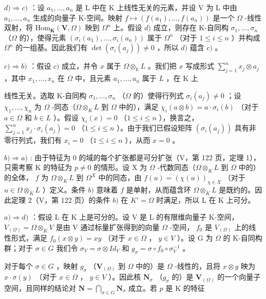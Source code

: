 \(d) \Rightarrow c)\) ：设 \(a_1, \ldots, a_n\) 是 L 中在 K 上线性无关的元素，并设 V 为 L 中由 \(a_1, \ldots, a_n\) 生成的向量子 K-空间。映射 \(f \mapsto (f(a_1), \ldots, f(a_n))\) 是一个 \(\Omega\) -线性双射，将 \(\mathrm{Hom}_{\mathbf{K}}(\mathbf{V}, \Omega)\) 映到 \(\Omega^n\) 上。假设 \(d)\) 成立，则存在 K-自同构 \(\sigma_1, \ldots, \sigma_n\) （\(\Omega\) 的），使得元素 \((\sigma_i(a_1), \ldots, \sigma_i(a_n))\) 属于 \(\Omega^n\) （对于 \(1 \leqslant i \leqslant n\) ）并构成 \(\Omega^n\) 的一组基。因此我们有 \(\det(\sigma_i(a_j)) \neq 0\) ，所以 \(d)\) 蕴含 \(c)\) 。

\(c) \Rightarrow b)\) ：假设 \(c)\) 成立，并令 \(x\) 属于 \(\Omega \otimes_{\mathbb{K}} L\) 。我们把 \(x\) 写成形式 \(\sum_{j=1}^{n} x_j \otimes a_j\) ，其中 \(x_1, \ldots, x_n\) 在 \(\Omega\) 中，且元素 \(a_1, \ldots, a_n\) 属于 \(L\) ，在 K 上

线性无关。选取 K-自同构 \(\sigma_{1},\ldots,\sigma_{n}\) （\(\Omega\) 的）使得行列式 \(\sigma_{i}(a_{j})\neq0\) ；设 \(\chi_{1},\ldots,\chi_{n}\) 为 \(\Omega\) -同态（\(\Omega\otimes_{K}L\) 到 \(\Omega\) 中的），满足 \(\chi_{i}(a\otimes b)=a\cdot\sigma_{i}(b)\) （对于 \(a\in\Omega\) 和 \(b\in L\) ）。假设 \(\chi_{i}(x)=0\) （\(1\leqslant i\leqslant n\) ），换言之， \(\sum_{j=1}^{n}x_{j}\cdot\sigma_{i}(a_{j})=0\) （\(1\leqslant i\leqslant n\) ）。由于我们已假设矩阵 \((\sigma_{i}(a_{j}))\) 具有非零行列式，我们有 \(x_{i}=0\) （\(1\leqslant i\leqslant n\) ），从而 \(x=0\) 。

\(b) \Rightarrow a)\) : 由于特征为 0 的域的每个扩张都是可分扩张（V，第 122 页，定理 1），只需考察 K 的特征为 \(p \neq 0\) 的情形。设 X 为 \(\Omega\) -代数同态（\(\Omega \otimes_{K} L\) 到 \(\Omega\) 中的）的全体， \(f\) 为 \(\Omega \otimes_{K} L\) 到 \(\Omega^{X}\) 中的同态，由 \(f(u) = (\chi(u))_{\chi \in X}\) （对于 \(u \in \Omega \otimes_{K} L\) ）定义。条件 \(b)\) 意味着 \(f\) 是单射，从而蕴含环 \(\Omega \otimes_{K} L\) 是既约的。因此定理 2（V，第 122 页）的条件 \(b)\) 在 \(K' = \Omega\) 时满足，所以 L 在 K 上可分。

\(a) \Rightarrow d)\) ：假设 L 在 K 上是可分的。设 V 是 L 的有限维向量子 K-空间， \(V_{(\Omega)} = \Omega \otimes_K V\) 是由 V 通过标量扩张得到的向量 \(\Omega\) -空间， \(f_0\) 是 \(V_{(\Omega)}\) 上的线性形式，满足 \(f_0(x \otimes y) = xy\) （对于 \(x \in \Omega\) ， \(y \in V\) ）。设 G 为 \(\Omega\) 的 K-自同构群；对于 \(\sigma \in G\) 我们令 \(\sigma_V = \sigma \otimes Id_V\) 和 \(g_\sigma = \sigma \circ f_0 \circ \sigma_V^{-1}\) 。

对于每个 \(\sigma \in G\) ，映射 \(g_{\sigma}\) （\(\mathbf{V}_{(\Omega)}\) 到 \(\Omega\) 中的）是 \(\Omega\) -线性的，且将 \(x \otimes y\) 映为 \(x \cdot \sigma(y)\) （对于 \(x \in \Omega\) ， \(y \in V\) ）。因此核 \(\mathbf{N}_{\sigma}\) （\(g_{\sigma}\) 的）是 \(\mathbf{V}_{(\Omega)}\) 的一个向量子空间，且同样的结论对 \(\mathbf{N} = \bigcap_{\sigma \in G} \mathbf{N}_{\sigma}\) 成立。若 \(p\) 是 K 的特征


